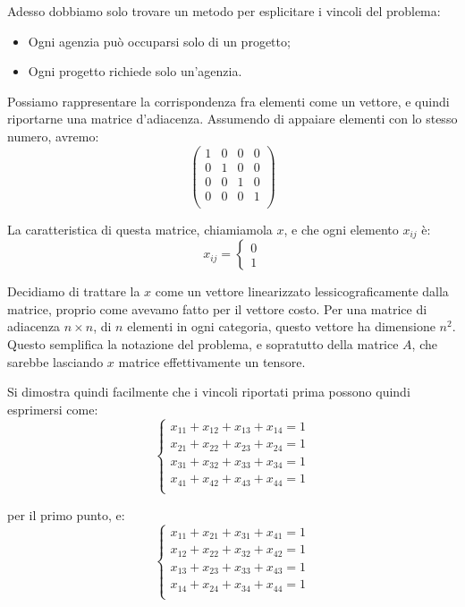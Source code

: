 \documentclass[a4paper,11pt]{article}
\begin{document}
Adesso dobbiamo solo trovare un metodo per esplicitare i vincoli del problema:
\begin{itemize}
	\item Ogni agenzia può occuparsi solo di un progetto;
	\item Ogni progetto richiede solo un'agenzia.
\end{itemize}

Possiamo rappresentare la corrispondenza fra elementi come un vettore, e quindi riportarne una matrice d'adiacenza.
Assumendo di appaiare elementi con lo stesso numero, avremo:
$$
\begin{pmatrix}
	1 & 0 & 0 & 0 \\ 
	0 & 1 & 0 & 0 \\ 
	0 & 0 & 1 & 0 \\ 
	0 & 0 & 0 & 1 \\ 
\end{pmatrix}
$$

La caratteristica di questa matrice, chiamiamola $x$, e che ogni elemento $x_{ij}$ è:
$$
x_{ij} = 
	\begin{cases}
		0 \\ 1	
	\end{cases}
$$

Decidiamo di trattare la $x$ come un vettore linearizzato lessicograficamente dalla matrice, proprio come avevamo fatto per il vettore costo.
Per una matrice di adiacenza $n \times n$, di $n$ elementi in ogni categoria, questo vettore ha dimensione $n^2$. 
Questo semplifica la notazione del problema, e sopratutto della matrice $A$, che sarebbe lasciando $x$ matrice effettivamente un tensore.

Si dimostra quindi facilmente che i vincoli riportati prima possono quindi esprimersi come:
\[
	\begin{cases}
		x_{11} + x_{12} + x_{13} + x_{14} = 1	\\
		x_{21} + x_{22} + x_{23} + x_{24} = 1 \\ 
		x_{31} + x_{32} + x_{33} + x_{34} = 1 \\ 
		x_{41} + x_{42} + x_{43} + x_{44} = 1 \\ 
	\end{cases}
\]

per il primo punto, e:
\[
	\begin{cases}
		x_{11} + x_{21} + x_{31} + x_{41} = 1	\\
		x_{12} + x_{22} + x_{32} + x_{42} = 1 \\ 
		x_{13} + x_{23} + x_{33} + x_{43} = 1 \\ 
		x_{14} + x_{24} + x_{34} + x_{44} = 1 \\ 
	\end{cases}
\]
\end{document}
